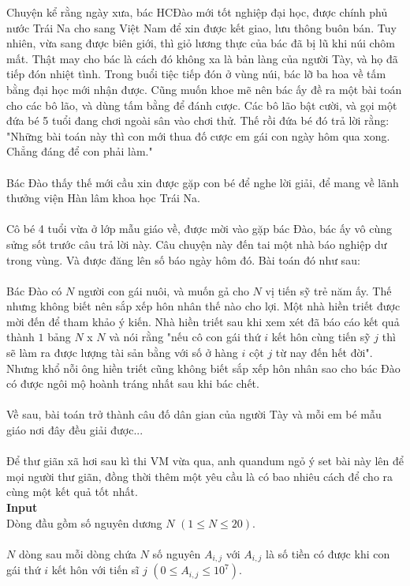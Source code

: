 Chuyện kể rằng ngày xưa, bác HCĐào mới tốt nghiệp đại học, được chính phủ nước Trái Na cho sang Việt Nam để xin được kết giao, lưu thông buôn bán. Tuy nhiên, vừa sang được biên giới, thì giỏ lương thực của bác đã bị lũ khi núi chôm mất. Thật may cho bác là cách đó không xa là bản làng của người Tày, và họ đã tiếp đón nhiệt tình. Trong buổi tiệc tiếp đón ở vùng núi, bác lỡ ba hoa về tấm bằng đại học mới nhận được. Cũng muốn khoe mẽ nên bác ấy đề ra một bài toán cho các bô lão, và dùng tấm bằng để đánh cược. Các bô lão bật cười, và gọi một đứa bé 5 tuổi đang chơi ngoài sân vào chơi thử. Thế rồi đứa bé đó trả lời rằng: "Những bài toán này thì con mới thua đố cược em gái con ngày hôm qua xong. Chẳng đáng để con phải làm."
\\
\\
Bác Đào thấy thế mới cầu xin được gặp con bé để nghe lời giải, để mang về lãnh thưởng viện Hàn lâm khoa học Trái Na.
\\
\\
Cô bé 4 tuổi vừa ở lớp mẫu giáo về, được mời vào gặp bác Đào, bác ấy vô cùng sửng sốt trước câu trả lời này. Câu chuyện này đến tai một nhà báo nghiệp dư trong vùng. Và được đăng lên số báo ngày hôm đó. Bài toán đó như sau:
\\
\\
Bác Đào có $N$ người con gái nuôi, và muốn gả cho $N$ vị tiến sỹ trẻ năm ấy. Thế nhưng không biết nên sắp xếp hôn nhân thế nào cho lợi. Một nhà hiền triết được mời đến để tham khảo ý kiến. Nhà hiền triết sau khi xem xét đã báo cáo kết quả thành $1$ bảng $N$ x $N$ và nói rằng "nếu cô con gái thứ $i$ kết hôn cùng tiến sỹ $j$ thì sẽ làm ra được lượng tài sản bằng với số ở hàng $i$ cột $j$ từ nay đến hết đời". Nhưng khổ nỗi ông hiền triết cũng không biết sắp xếp hôn nhân sao cho bác Đào có được ngôi mộ hoành tráng nhất sau khi bác chết.
\\
\\
Về sau, bài toán trở thành câu đố dân gian của người Tày và mỗi em bé mẫu giáo nơi đây đều giải được...
\\
\\
Để thư giãn xã hơi sau kì thi VM vừa qua, anh quandum ngỏ ý set bài này lên để mọi người thư giãn, đồng thời thêm một yêu cầu là có bao nhiêu cách để cho ra cùng một kết quả tốt nhất.
\\

\textbf{Input}
\\
Dòng đầu gồm số nguyên dương $N$ $(1 \leq N \leq 20)$.
\\
\\
$N$ dòng sau mỗi dòng chứa $N$ số nguyên $A_{i,j}$ với $A_{i,j}$ là số tiền có được khi con gái thứ $i$ kết hôn với tiến sĩ $j$ $(0 \leq A_{i,j} \leq 10^{7})$.
\\

